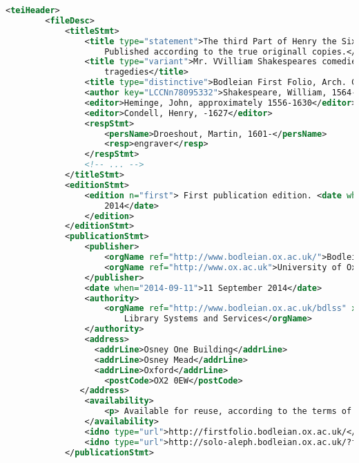\documentclass[class=article, crop=false]{standalone}
\begin{document}
\begin{lstlisting}[language=XML]
<teiHeader>
        <fileDesc>
            <titleStmt>
                <title type="statement">The third Part of Henry the Sixt, with the death of the Duke of Yorke from Mr. William Shakespeares comedies, histories, &amp; tragedies.
                    Published according to the true originall copies.</title>
                <title type="variant">Mr. VVilliam Shakespeares comedies, histories, &amp;
                    tragedies</title>
                <title type="distinctive">Bodleian First Folio, Arch. G c.7</title>
                <author key="LCCNn78095332">Shakespeare, William, 1564-1616.</author>
                <editor>Heminge, John, approximately 1556-1630</editor>
                <editor>Condell, Henry, -1627</editor>
                <respStmt>
                    <persName>Droeshout, Martin, 1601-</persName>
                    <resp>engraver</resp>
                </respStmt>
                <!-- ... -->
            </titleStmt>
            <editionStmt>
                <edition n="first"> First publication edition. <date when="2014-04-23">23 April
                    2014</date>
                </edition>
            </editionStmt>
            <publicationStmt>
                <publisher>
                    <orgName ref="http://www.bodleian.ox.ac.uk/">Bodleian Libraries</orgName>,
                    <orgName ref="http://www.ox.ac.uk">University of Oxford</orgName>
                </publisher>
                <date when="2014-09-11">11 September 2014</date>                 
                <authority>
                    <orgName ref="http://www.bodleian.ox.ac.uk/bdlss" xml:id="bdlss">Bodleian Digital
                        Library Systems and Services</orgName>
                </authority>
                <address>
                  <addrLine>Osney One Building</addrLine>
                  <addrLine>Osney Mead</addrLine>
                  <addrLine>Oxford</addrLine>
                    <postCode>OX2 0EW</postCode>
               </address>
                <availability>
                    <p> Available for reuse, according to the terms of the <ref target="http://creativecommons.org/licenses/by/3.0/">Creative Commons Attribution 3.0 Unported</ref>.</p>
                </availability>
                <idno type="url">http://firstfolio.bodleian.ox.ac.uk/</idno>
                <idno type="url">http://solo-aleph.bodleian.ox.ac.uk/?func=direct&amp;doc_number=011814163&amp;format=999&amp;local_base=HOL60</idno>
            </publicationStmt>
            

\end{lstlisting}
\end{document}
